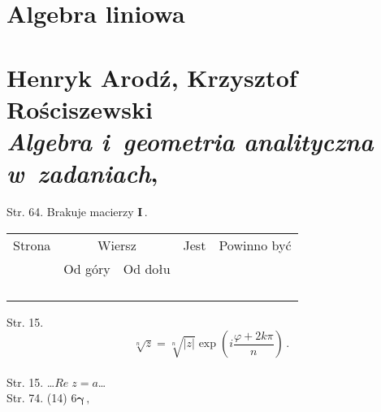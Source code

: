 \documentclass[a4paper,11pt]{article}
\numberwithin{equation}{section}
\begin{document}










\newpage

\section{Algebra liniowa}

\VerSpaceTwo



\section{ %
  Henryk Arodź, Krzysztof Rościszewski \\
  \textit{Algebra i~geometria analityczna w~zadaniach}, \cite{}}

\vspace{0em}



\vspace{0em}


Str. 64. Brakuje macierzy $\mathbf{I} \, .$





\newpage



\begin{center}

  \begin{tabular}{|c|c|c|c|c|}
    \hline
    Strona & \multicolumn{2}{c|}{Wiersz} & Jest
                              & Powinno być \\ \cline{2-3}
    & Od góry & Od dołu & & \\
    \hline
    & & & & \\
    & & & & \\
    & & & & \\
    & & & & \\
    \hline
  \end{tabular}

\end{center}

\VerSpaceSix


Str. 15.
$$\sqrt[ n ]{ z } = \sqrt[ n ]{ | z | } \exp( i \frac{ \varphi + 2 k
  \pi }{ n } ) \, .$$ \\
Str. 15. \ldots $Re \; z = a$\ldots \\
Str. 74. (14) $6 \boldsymbol{ \gamma } \, ,$ \\
\end{document}
